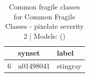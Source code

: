 \begin{table}
\caption{Common fragile classes for Common Fragile Classes - pixelate severity 2 | Models: ()}
\label{tab:Common Fragile Classes - pixelate severity 2_d41d8cd9}
\begin{tabular}{cll}
\toprule
 & synset & label \\
\midrule
6 & n01498041 & stingray \\
\bottomrule
\end{tabular}
\end{table}
